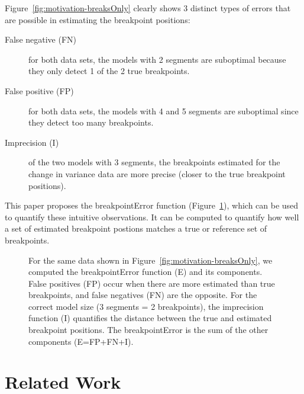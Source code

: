 \documentclass{jsfds} %
\begin{document}
\newpage

Figure~\ref{fig:motivation-breaksOnly} clearly shows 3 distinct types
of errors that are possible in estimating the breakpoint positions:
\begin{description}
\item[False negative (FN)] for both data sets, the models with 2
segments are suboptimal because they only detect 1 of the 2 true
breakpoints.
\item[False positive (FP)] for both data sets, the models with 4 and 5
  segments are suboptimal since they detect too many breakpoints.
\item[Imprecision (I)] of the two models with 3 segments, the
  breakpoints estimated for the change in variance data are more
  precise (closer to the true breakpoint positions).
\end{description}

This paper proposes the breakpointError function
(Figure~\ref{fig:motivation-breakpointError}), which can be used to
quantify these intuitive observations. It can be computed to quantify
how well a set of estimated breakpoint postions matches a true or
reference set of breakpoints.


\begin{figure}[H]
  \centering
  
  \vskip -0.7cm
  \caption{For the same data shown in
    Figure~\ref{fig:motivation-breaksOnly}, we computed the
    breakpointError function (E) and its components. False positives
    (FP) occur when there are more estimated than true breakpoints,
    and false negatives (FN) are the opposite. For the correct model
    size (3 segments = 2 breakpoints), the imprecision function (I)
    quantifies the distance between the true and estimated breakpoint
    positions. The breakpointError is the sum of the other components
    (E=FP+FN+I).}
  \label{fig:motivation-breakpointError}
\end{figure}



\newpage

\section{Related Work}
\end{document}
